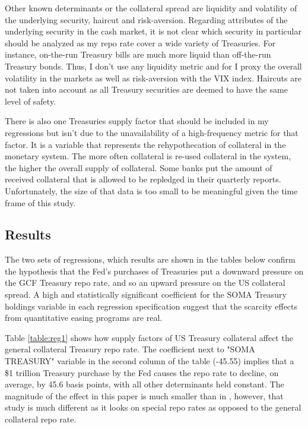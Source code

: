 \documentclass[11pt,a4paper,english,oneside]{article}
\begin{document}
Other known determinants or the collateral spread are liquidity and volatility of the underlying security, haircut and risk-aversion. Regarding attributes of the underlying security in the cash market, it is not clear which security in particular should be analyzed as my repo rate cover a wide variety of Treasuries. For instance, on-the-run Treasury bills are much more liquid than off-the-run Treasury bonds. Thus, I don't use any liquidity metric and for I proxy the overall volatility in the markets as well as risk-aversion with the VIX index. Haircuts are not taken into account as all Treasury securities are deemed to have the same level of safety.

There is also one Treasuries supply factor that should be included in my regressions but isn't due to the unavailability of a high-frequency metric for that factor. It is a variable that represents the rehypothecation of collateral in the monetary system. The more often collateral is re-used collateral in the system, the higher the overall supply of collateral. Some banks put the amount of received  collateral that is allowed to be repledged in their quarterly reports. Unfortunately, the size of that data is too small to be meaningful given the time frame of this study.

\subsection{Results} \label{sec:results}

The two sets of regressions, which results are shown in the tables below confirm the hypothesis that the Fed's purchases of Treasuries put a downward pressure on the GCF Treasury repo rate, and so an upward pressure on the US collateral spread. A high and statistically significant coefficient for the SOMA Treasury holdings variable in each regression specification suggest that the scarcity effects from quantitative easing programs are real.

Table \ref{table:reg1} shows how supply factors of US Treasury collateral affect the general collateral Treasury repo rate. The coefficient next to "SOMA TREASURY" variable in the second column of the table (-45.55) implies that a \$1 trillion Treasury purchase by the Fed causes the repo rate to decline, on average, by 45.6 basis points, with all other determinants held constant. The magnitude of the effect in this paper is much smaller than in \citet{damico2014}, however, that study is much different as it looks on special repo rates as opposed to the general collateral repo rate.
\end{document}
